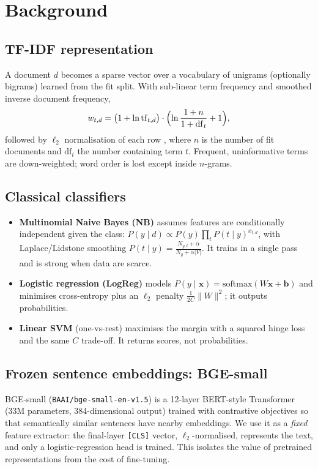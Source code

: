\section{Background}
\label{sec:background}

\subsection{TF-IDF representation}
A document $d$ becomes a sparse vector over a vocabulary of unigrams (optionally bigrams) learned from the fit split. With sub-linear term frequency and smoothed inverse document frequency,
\[
w_{t,d} = \bigl(1 + \ln \mathrm{tf}_{t,d}\bigr)\cdot\Bigl(\ln\frac{1+n}{1+\mathrm{df}_t} + 1\Bigr),
\]
followed by $\ell_2$ normalisation of each row \cite{salton1988}, where $n$ is the number of fit documents and $\mathrm{df}_t$ the number containing term $t$. Frequent, uninformative terms are down-weighted; word order is lost except inside $n$-grams.

\subsection{Classical classifiers}
\begin{itemize}
  \item \textbf{Multinomial Naive Bayes (NB)} assumes features are conditionally independent given the class: $P(y\mid d)\propto P(y)\prod_t P(t\mid y)^{x_{t,d}}$, with Laplace/Lidstone smoothing $P(t\mid y)=\frac{N_{y,t}+\alpha}{N_y+\alpha|V|}$. It trains in a single pass and is strong when data are scarce.
  \item \textbf{Logistic regression (LogReg)} models $P(y\mid \mathbf{x})=\mathrm{softmax}(W\mathbf{x}+\mathbf{b})$ and minimises cross-entropy plus an $\ell_2$ penalty $\tfrac{1}{2C}\lVert W\rVert^2$; it outputs probabilities.
  \item \textbf{Linear SVM} (one-vs-rest) maximises the margin with a squared hinge loss and the same $C$ trade-off. It returns scores, not probabilities.
\end{itemize}

\subsection{Frozen sentence embeddings: BGE-small}
BGE-small (\nolinkurl{BAAI/bge-small-en-v1.5}) \cite{xiao2023} is a 12-layer BERT-style Transformer (33M parameters, 384-dimensional output) trained with contrastive objectives so that semantically similar sentences have nearby embeddings. We use it as a \emph{fixed} feature extractor: the final-layer \texttt{[CLS]} vector, $\ell_2$-normalised, represents the text, and only a logistic-regression head is trained. This isolates the value of pretrained representations from the cost of fine-tuning.

